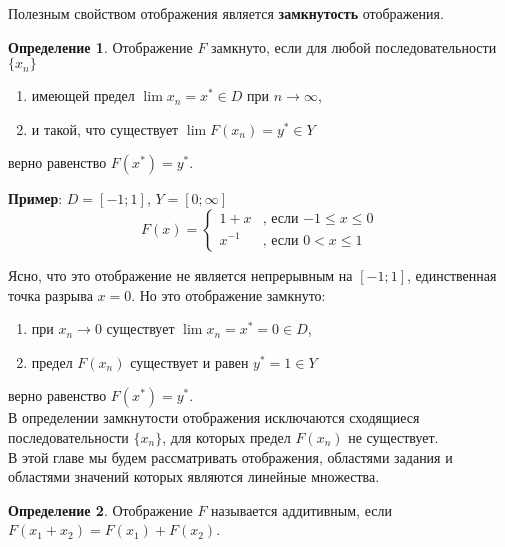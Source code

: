 \documentclass[12pt,a4paper,titlepage]{book}
\theoremstyle{definition}
\newtheorem*{definition}{Определение}
\theoremstyle{plain}
\theoremstyle{remark}
\theoremstyle{remark}
\theoremstyle{remark}
\theoremstyle{plain}
\begin{document}
Полезным свойством отображения является \textbf{замкнутость} отображения.

\begin{definition} Отображение $F$ замкнуто, если для любой последовательности  $\lbrace x_n \rbrace$

\begin{enumerate}

 \item имеющей предел $\lim x_n= x^* \in D$ при $n\rightarrow\infty$,
 
 \item и такой, что существует $\lim F(x_n)= y^* \in Y$
 
\end{enumerate} 
 
верно равенство $F(x^*)=y^*$.

\end{definition}

\textbf{Пример}: $D=[-1;1]$, $Y=[0;\infty]$
\begin{equation*}
F(x) = 
\begin{cases}
   1+x &\text{, если $-1\leqslant x \leqslant 0$}\\
   x^{-1} &\text{, если $0< x \leqslant 1$}
\end{cases}
\end{equation*}

Ясно, что это отображение не является непрерывным на $[-1;1]$, единственная точка разрыва $x=0$. Но это отображение замкнуто:

\begin{enumerate}

 \item при $x_n \rightarrow 0$ существует $\lim x_n= x^*=0 \in D$,
 
 \item предел $F(x_n)$ существует и равен $y^*=1 \in Y$
 
\end{enumerate}
верно равенство $F(x^*)=y^*$.\\

В определении замкнутости отображения исключаются сходящиеся последовательности $\lbrace x_n \rbrace$, для которых предел $F(x_n)$ не существует.\\

В этой главе мы будем рассматривать отображения, областями задания и областями значений которых являются линейные множества.

\begin{definition} Отображение $F$ называется аддитивным, если $F(x_1+x_2)=F(x_1)+F(x_2)$.
\end{definition}
\end{document}

